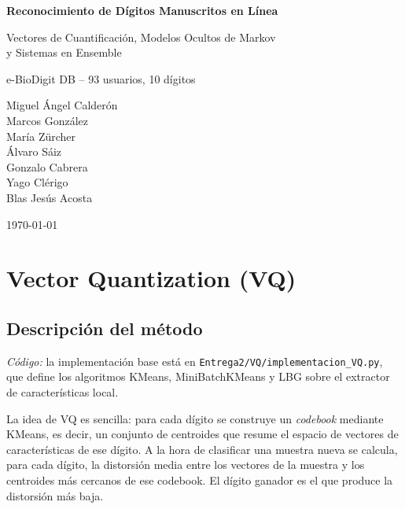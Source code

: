 \documentclass[11pt,a4paper]{article}
\begin{document}
\begin{titlepage}
  \centering
  \vspace*{3cm}
  {\LARGE\textbf{Reconocimiento de D\'{i}gitos Manuscritos en L\'{i}nea}\par}
  \vspace{0.8cm}
  {\large Vectores de Cuantificaci\'{o}n, Modelos Ocultos de Markov\\y Sistemas en Ensemble\par}
  \vspace{0.5cm}
  {\normalsize e-BioDigit DB -- 93 usuarios, 10 d\'{i}gitos\par}
  \vfill
  {\large
    Miguel \'{A}ngel Calder\'{o}n\\[0.3em]
    Marcos Gonz\'{a}lez\\[0.3em]
    Mar\'{i}a Z\"{u}rcher\\[0.3em]
    \'{A}lvaro S\'{a}iz\\[0.3em]
    Gonzalo Cabrera\\[0.3em]
    Yago Cl\'{e}rigo\\[0.3em]
    Blas Jes\'{u}s Acosta\par
  }
  \vspace{2cm}
  {\normalsize \today\par}
\end{titlepage}

\tableofcontents
\newpage

\newpage
\section{Vector Quantization (VQ)}

\subsection{Descripci\'{o}n del m\'{e}todo}

\textit{C\'{o}digo:} la implementaci\'{o}n base est\'{a} en
\texttt{Entrega2/VQ/implementacion\_VQ.py}, que define los algoritmos
KMeans, MiniBatchKMeans y LBG sobre el extractor de caracter\'{i}sticas local.

La idea de VQ es sencilla: para cada d\'{i}gito se construye un \emph{codebook}
mediante KMeans, es decir, un conjunto de centroides que resume el espacio de
vectores de caracter\'{i}sticas de ese d\'{i}gito. A la hora de clasificar una muestra
nueva se calcula, para cada d\'{i}gito, la distorsi\'{o}n media entre los vectores de
la muestra y los centroides m\'{a}s cercanos de ese codebook. El d\'{i}gito ganador
es el que produce la distorsi\'{o}n m\'{a}s baja.
\end{document}

